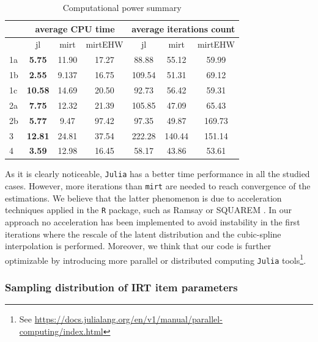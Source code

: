 \begin{table}[H]
	\label{tab:cases}
	\renewcommand{\arraystretch}{1.5}%
	\centering
	\caption{Computational power summary}
	\begin{tabular}{ l  c c  c  c c c  }
		\toprule
		& \multicolumn{3}{c}{average CPU time} & \multicolumn{3}{c}{average iterations count} \\
		\toprule
		& {jl} &{mirt} & {mirt\tiny{EHW}} & {jl} &{mirt} & {mirt\tiny{EHW}}  \\
		\midrule
		1a    &\textbf{5.75} & 11.90 &17.27 &88.88 & 55.12  & 59.99  \\%
		1b    &\textbf{2.55}  & 9.137 &16.75 & 109.54  &51.31 & 69.12 \\%
		1c    &\textbf{10.58}  &14.69  & 20.50 & 92.73 &56.42 & 59.31\\%
		2a    & \textbf{7.75}  &12.32 & 21.39 &105.85  & 47.09 & 65.43 \\%
		2b    &\textbf{5.77}  & 9.47 & 97.42 & 97.35 & 49.87 & 169.73\\%
		3    & \textbf{12.81} & 24.81 &37.54 & 222.28  & 140.44 & 151.14\\%
		4    & \textbf{3.59} & 12.98  &16.45  &58.17  &43.86  &53.61 \\%
		\bottomrule   
		
	\end{tabular}
	
\end{table}

As it is clearly noticeable, \texttt{Julia} has a better time performance in all the studied cases. However, more iterations than \texttt{mirt} are needed to reach convergence of the estimations. We believe that the latter phenomenon is due to acceleration techniques applied in the \texttt{R} package, such as Ramsay or SQUAREM \parencite{varadhan2008simple}. In our approach no acceleration has been implemented to avoid instability in the first iterations where the rescale of the latent distribution and the cubic-spline interpolation is performed. 
Moreover, we think that our code is further optimizable by introducing more parallel or distributed computing \texttt{Julia} tools\footnote{See \url{https://docs.julialang.org/en/v1/manual/parallel-computing/index.html}}.

\subsubsection{Sampling distribution of IRT item parameters}

